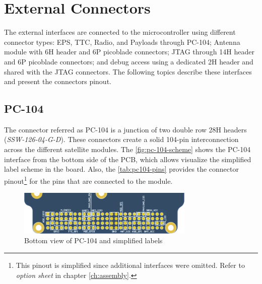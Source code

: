 
\section{External Connectors}

The external interfaces are connected to the microcontroller using different connector types: EPS, TTC, Radio, and Payloads through PC-104; Antenna module with 6H header and 6P picoblade connectors; JTAG through 14H header and 6P picoblade connectors; and debug access using a dedicated 2H header and shared with the JTAG connectors. The following topics describe these interfaces and present the connectors pinout.

\subsection{PC-104} \label{sec:pc104}


The connector referred as PC-104 is a junction of two double row 28H headers (\textit{SSW-126-04-G-D}). These connectors create a solid 104-pin interconnection across the different satellite modules. The \autoref{fig:pc-104-scheme} shows the PC-104 interface from the bottom side of the PCB, which allows visualize the simplified label scheme in the board. Also, the \autoref{tab:pc104-pins} provides the connector pinout\footnote{This pinout is simplified since additional interfaces were omitted. Refer to \textit{option sheet} in chapter \ref{ch:assembly}.} for the pins that are connected to the module. 

\begin{figure}[!ht]
    \begin{center}
        \includegraphics[width=0.75\textwidth]{figures/pc-104-scheme.png}
        \caption{Bottom view of PC-104 and simplified labels}
        \label{fig:pc-104-scheme}
    \end{center}
\end{figure}

